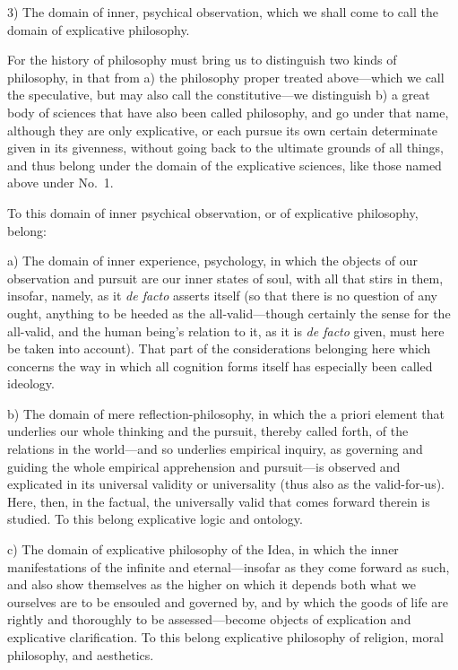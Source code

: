 \documentclass[12pt,a4paper]{book}
\begin{document}
3) The domain of inner, psychical observation, which we shall come to call the
domain of explicative philosophy.

For the history of philosophy must bring us to distinguish two kinds of
philosophy, in that from a) the philosophy proper treated above---which we call
the speculative, but may also call the constitutive---we distinguish b) a great
body of sciences that have also been called philosophy, and go under that name,
although they are only explicative, or each pursue its own certain determinate
given in its givenness, without going back to the ultimate grounds of all things,
and thus belong under the domain of the explicative sciences, like those named
above under No.~1.

To this domain of inner psychical observation, or of explicative philosophy,
belong:

a) The domain of inner experience, psychology, in which the objects of our
observation and pursuit are our inner states of soul, with all that stirs in them,
insofar, namely, as it \textit{de facto} asserts itself (so that there is no
question of any ought, anything to be heeded as the all-valid---though certainly
the sense for the all-valid, and the human being's relation to it, as it is
\textit{de facto} given, must here be taken into account). That part of the
considerations belonging here which concerns the way in which all cognition forms
itself has especially been called ideology.

b) The domain of mere reflection-philosophy, in which the a priori element that
underlies our whole thinking and the pursuit, thereby called forth, of the
relations in the world---and so underlies empirical inquiry, as governing and
guiding the whole empirical apprehension and pursuit---is observed and explicated
in its universal validity or universality (thus also as the valid-for-us). Here,
then, in the factual, the universally valid that comes forward therein is studied.
To this belong explicative logic and ontology.

c) The domain of explicative philosophy of the Idea, in which the inner
manifestations of the infinite and eternal---insofar as they come forward as such,
and also show themselves as the higher on which it depends both what we ourselves
are to be ensouled and governed by, and by which the goods of life are rightly and
thoroughly to be assessed---become objects of explication and explicative
clarification. To this belong explicative philosophy of religion, moral
philosophy, and aesthetics.
\end{document}
